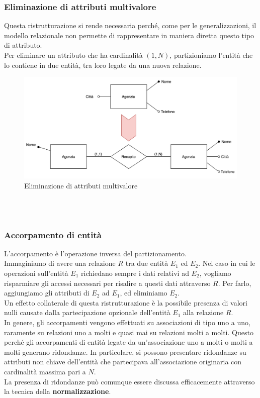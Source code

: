 \subsubsection{Eliminazione di attributi multivalore}
Questa ristrutturazione si rende necessaria perché, come per le generalizzazioni, il modello relazionale non permette di rappresentare in maniera diretta questo tipo di attributo.\\
Per eliminare un attributo che ha cardinalità $(1,N)$, partizioniamo l'entità che lo contiene in due entità, tra loro legate da una nuova relazione.
    \begin{figure}
        \centering
        \includegraphics[scale = 0.6]{15/img4}
        \caption{Eliminazione di attributi multivalore}
    \end{figure}\\\\
\subsubsection{Accorpamento di entità}
L'accorpamento è l'operazione inversa del partizionamento.\\
Immaginiamo di avere una relazione $R$ tra due entità $E_1$ ed $E_2$. Nel caso in cui le operazioni sull'entità $E_1$ richiedano sempre i dati relativi ad $E_2$, vogliamo risparmiare gli accessi necessari per risalire a questi dati attraverso $R$. Per farlo, aggiungiamo gli attributi di $E_2$ ad $E_1$, ed eliminiamo $E_2$.\\
Un effetto collaterale di questa ristrutturazione è la possibile presenza di valori nulli causate dalla partecipazione opzionale dell'entità $E_1$ alla relazione $R$.\\
In genere, gli accorpamenti vengono effettuati su associazioni di tipo uno a uno, raramente su relazioni uno a molti e quasi mai su relazioni molti a molti. Questo perché gli accorpamenti di entità legate da un'associazione uno a molti o molti a molti generano ridondanze. In particolare, si possono presentare ridondanze su attributi non chiave dell'entità che partecipava all'associazione originaria con cardinalità massima pari a $N$.\\
La presenza di ridondanze può comunque essere discussa efficacemente attraverso la tecnica della \textbf{normalizzazione}.
